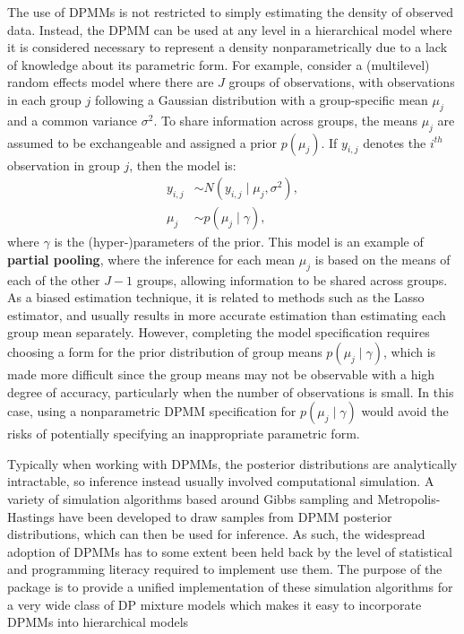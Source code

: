 \documentclass[nojss]{jss}
\begin{document}
The use of DPMMs is not restricted to simply estimating the density of observed data. Instead, the DPMM can be used at any level in a hierarchical model where it is considered necessary to represent a density nonparametrically due to a lack of knowledge about its parametric form. For example, consider a (multilevel) random effects model where there are $J$ groups of observations, with observations in each group $j$ following a Gaussian distribution with a group-specific mean $\mu_j$ and a common variance $\sigma^2$. To share information across groups, the means $\mu_j$ are assumed to be exchangeable and assigned a prior $p(\mu_j)$. If $y_{i,j}$ denotes the $i^{th}$ observation in group $j$, then the model is:
\begin{align*}
y_{i,j} & \sim N(y_{i,j} \mid \mu_j,\sigma^2), \\
\mu_j & \sim p(\mu_j \mid \gamma),
\end{align*}
where $\gamma$ is the (hyper-)parameters of the prior. This model is an example of \textbf{partial pooling}, where the inference for each mean $\mu_j$ is based on the means of each of the other $J-1$ groups, allowing information to be shared across groups. As a biased estimation technique, it is related to methods such as the Lasso estimator, and usually results in more accurate estimation than estimating each group mean separately. However, completing the model specification requires choosing a form for the prior distribution of group means $p(\mu_j \mid \gamma) $, which is made more difficult since the group means may not be observable with a high degree of accuracy, particularly when the number of observations is small. In this case, using a nonparametric DPMM specification for $p(\mu_j \mid \gamma) $ would avoid the risks of potentially specifying an inappropriate parametric form.

Typically when working with DPMMs, the posterior distributions are analytically intractable, so inference instead usually involved computational simulation. A variety of simulation algorithms based around Gibbs sampling and Metropolis-Hastings have been developed to draw samples from DPMM posterior distributions, which can then be used for inference. As such, the widespread adoption of DPMMs has to some extent been held back by the level of statistical and programming literacy required to implement use them. The purpose of the  package is to provide a unified implementation of these simulation algorithms for a very wide class of DP mixture models which makes it easy to incorporate DPMMs into hierarchical models
\end{document}
